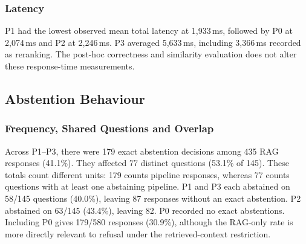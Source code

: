 \subsubsection{Latency}
\begin{table}[H]
\centering
\caption{Per-question response latency in milliseconds ($n=145$ per
configuration). Total time includes retrieval, reranking and answer
generation where applicable; median and standard deviation (SD) describe
total time. NA marks stages a configuration does not use. These timings
exclude startup and the subsequent evaluation calls.}
\label{tab:main-latency-results}
\end{table}
P1 had the lowest observed mean total latency at 1,933\,ms, followed by P0 at
2,074\,ms and P2 at 2,246\,ms. P3 averaged 5,633\,ms, including 3,366\,ms
recorded as reranking. The post-hoc correctness and similarity evaluation
does not alter these response-time measurements.

\subsection{Abstention Behaviour}
\subsubsection{Frequency, Shared Questions and Overlap}
Across P1--P3, there were 179 exact abstention decisions among 435 RAG
responses (41.1\%). They affected 77 distinct questions (53.1\% of 145).
These totals count different units: 179 counts pipeline responses, whereas
77 counts questions with at least one abstaining pipeline. P1 and P3 each
abstained on 58/145 questions (40.0\%), leaving 87 responses without an exact
abstention. P2 abstained on 63/145 (43.4\%), leaving 82. P0 recorded no exact
abstentions. Including P0 gives 179/580 responses (30.9\%), although the
RAG-only rate is more directly relevant to refusal under the retrieved-context
restriction.

